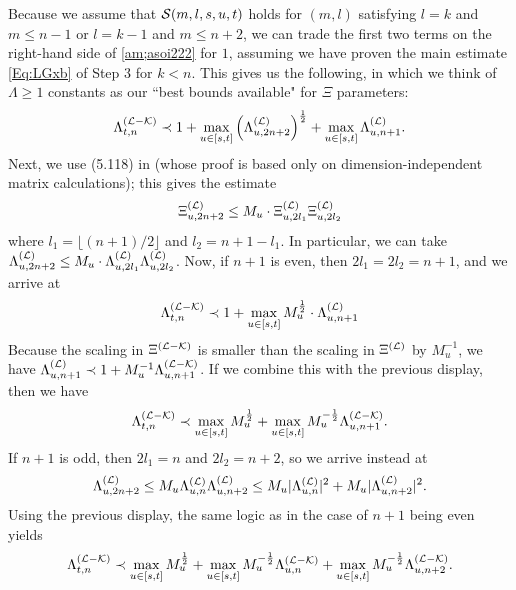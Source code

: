 Because we assume that ${\cal S}(m,l,s,u,t)$ holds for $(m,l)$ satisfying $l=k$ and $m\leq n-1$ or $l=k-1$ and $m\leq n+2$, we can trade the first two terms on the right-hand side of \eqref{am;asoi222} for $1$, assuming we have proven the main estimate \eqref{Eq:LGxb} of Step 3 for $k<n$. This gives us the following, in which we think of $\Lambda\geq1$ constants as our ``best bounds available" for $\Xi$ parameters: 
%
\begin{align*}
\Lambda_{t,n}^{({\cal L}-{\cal K})}\prec1+\max_{u\in[s,t]}\Big(\Lambda^{({\cal L})}_{u,2n+2}\Big)^{\frac12}+\max_{u\in[s,t]}\Lambda_{u,n+1}^{({\cal L})}.
\end{align*}
%
Next, we use (5.118) in \cite{YY_25} (whose proof is based only on dimension-independent matrix calculations); this gives the estimate
%
\begin{align*}
\Xi^{({\cal L})}_{u,2n+2}\leq M_{u}\cdot \Xi^{({\cal L})}_{u,2l_{1}}\Xi^{(\cal L)}_{u,2l_{2}}
\end{align*}
%
where $l_{1}=\lfloor(n+1)/2\rfloor$ and $l_{2}=n+1-l_{1}$. In particular, we can take $\Lambda^{({\cal L})}_{u,2n+2}\leq M_{u}\cdot\Lambda ^{({\cal L})}_{u,2l_{1}}\Lambda^{({\cal L})}_{u,2l_{2}}$. Now, if $n+1$ is even, then $2l_{1}=2l_{2}=n+1$, and we arrive at
%
\begin{align*}
\Lambda^{({\cal L}-{\cal K})}_{t,n}\prec1+\max_{u\in[s,t]}M_{u}^{\frac12}\cdot\Lambda^{({\cal L})}_{u,n+1}
\end{align*}
%
Because the scaling in $\Xi^{({\cal L}-{\cal K})}$ is smaller than the scaling in $\Xi^{({\cal L})}$ by $M_{u}^{-1}$, we have $\Lambda_{u,n+1}^{({\cal L})}\prec1+M_{u}^{-1}\Lambda_{u,n+1}^{({\cal L}-{\cal K})}$. If we combine this with the previous display, then we have 
%
\begin{align*}
\Lambda^{({\cal L}-{\cal K})}_{t,n}\prec \max_{u\in[s,t]}M_{u}^{\frac12}+\max_{u\in[s,t]}M_{u}^{-\frac12}\Lambda^{({\cal L}-{\cal K})}_{u,n+1}.
\end{align*}
%
If $n+1$ is odd, then $2l_{1}=n$ and $2l_{2}=n+2$, so we arrive instead at 
%
\begin{align*}
\Lambda^{({\cal L})}_{u,2n+2}\leq M_{u}\Lambda^{({\cal L})}_{u,n}\Lambda^{({\cal L})}_{u,n+2}\leq M_{u}|\Lambda^{({\cal L})}_{u,n}|^{2}+M_{u}|\Lambda^{({\cal L})}_{u,n+2}|^{2}.
\end{align*}
%
Using the previous display, the same logic as in the case of $n+1$ being even yields
%
\begin{align*}
\Lambda^{({\cal L}-{\cal K})}_{t,n}\prec \max_{u\in[s,t]}M_{u}^{\frac12}+\max_{u\in[s,t]} M_{u}^{-\frac12}\Lambda^{({\cal L}-{\cal K})}_{u,n}+\max_{u\in[s,t]} M_{u}^{-\frac12}\Lambda^{({\cal L}-{\cal K})}_{u,n+2}.
\end{align*}
